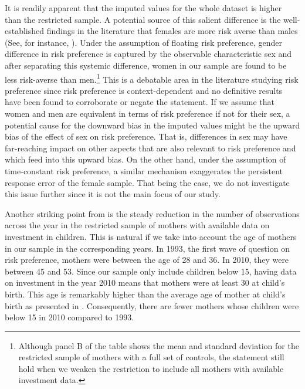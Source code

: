 \documentclass[]{article}
\begin{document}
It is readily apparent that the imputed values for the whole dataset is higher than the restricted sample. A potential source of this salient difference is the well-established findings in the literature that females are more risk averse than males (See, for instance, \citet{croson2009gender, jianakoplos1998women, powell1997gender}). Under the assumption of floating risk preference, gender difference in risk preference is captured by the observable characteristic sex and after separating this systemic difference, women in our sample are found to be less risk-averse than men.\footnote{Although panel B of the table shows the mean and standard deviation for the restricted sample of mothers with a full set of controls, the statement still hold when we weaken the restriction to include all mothers with available investment data.} This is a debatable area in the literature studying risk preference since risk preference is context-dependent and no definitive results have been found to corroborate or negate the statement. If we assume that women and men are equivalent in terms of risk preference if not for their sex, a potential cause for the downward bias in the imputed values might be the upward bias of the effect of sex on risk preference. That is, differences in sex may have far-reaching impact on other aspects that are also relevant to risk preference and which feed into this upward bias.  On the other hand, under the assumption of time-constant risk preference, a similar mechanism exaggerates the persistent response error of the female sample. That being the case, we do not investigate this issue further since it is not the main focus of our study.  

Another striking point from  is the steady reduction in the number of observations across the year in the restricted sample of mothers with available data on investment in children. This is natural if we take into account the age of mothers in our sample in the corresponding years. In 1993, the first wave of question on risk preference, mothers were between the age of 28 and 36. In 2010, they were between 45 and 53. Since our sample only include children below 15, having data on investment in the year 2010 means that mothers were at least 30 at child's birth. This age is remarkably higher than the average age of mother at child's birth as presented in . Consequently, there are fewer mothers whose children were below 15 in 2010 compared to 1993. 
\end{document}
